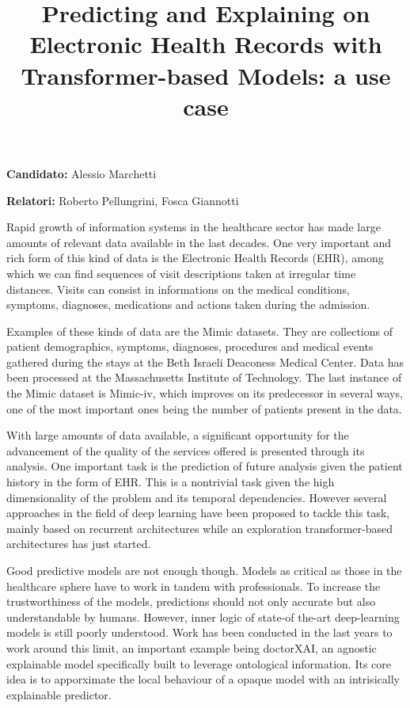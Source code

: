 \documentclass[]{marticle}
\title{\textbf{\huge Predicting and Explaining on Electronic Health Records  with Transformer-based Models: a use case}}
\date{}
\author{}
\begin{document}
\maketitle

\textbf{Candidato:} Alessio Marchetti

\textbf{Relatori:} Roberto Pellungrini, Fosca Giannotti

Rapid growth of information systems in the healthcare sector has made large amounts of relevant data
available in the last decades. One very important and rich form of this kind of data is the
Electronic Health Records (EHR), among which we can find sequences of visit descriptions taken at
irregular time distances. Visits can consist in informations on the medical conditions, symptoms,
diagnoses, medications and actions taken during the admission. 

Examples of these kinds of data are the Mimic datasets. They are collections of patient
demographics, symptoms, diagnoses, procedures and medical events gathered during the stays at the
Beth Israeli Deaconess Medical Center. Data has been processed at the Massachusetts Institute of
Technology. The last instance of the Mimic dataset is Mimic-iv, which improves on its predecessor in
several ways, one of the most important ones being the number of patients present in the data.

With large amounts of data available, a significant opportunity for the advancement of the quality
of the services offered is presented through its analysis. One important task is the prediction of
future analysis given the patient history in the form of EHR. This is a nontrivial task given the
high dimensionality of the problem and its temporal dependencies. However several approaches in the
field of deep learning have been proposed to tackle this task, mainly based on recurrent
architectures while an exploration transformer-based architectures has just started.

Good predictive models are not enough though. Models as critical as those in the healthcare sphere
have to work in tandem with professionals. To increase the trustworthiness of the models,
predictions should not only accurate but also understandable by humans. However, inner logic of
state-of the-art deep-learning models is still poorly understood. Work has been conducted in the
last years to work around this limit, an important example being doctorXAI, an agnostic explainable
model specifically built to leverage ontological information. Its core idea is to apporximate the
local behaviour of a opaque model with an intrisically explainable predictor.
\end{document}
